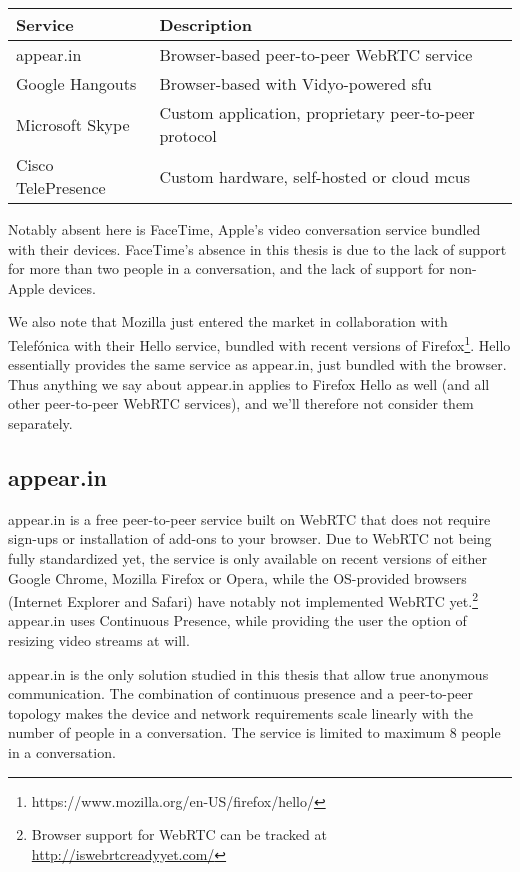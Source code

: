 \begin{center}
	\label{tab:existing-solutions}
	\begin{tabular}{| l | l |}
		\hline
		\textbf{Service} & \textbf{Description} \\ \hline
		appear.in & Browser-based peer-to-peer WebRTC service \\ \hline
		Google Hangouts & Browser-based with Vidyo-powered \gls{sfu} \\ \hline
		Microsoft Skype & Custom application, proprietary peer-to-peer protocol \\ \hline
		Cisco TelePresence & Custom hardware, self-hosted or cloud \glspl{mcu} \\ \hline
	\end{tabular}
\end{center}

Notably absent here is FaceTime, Apple's video conversation service bundled with their devices. FaceTime's absence in this thesis is due to the lack of support for more than two people in a conversation, and the lack of support for non-Apple devices.

We also note that Mozilla just entered the market in collaboration with Telefónica with their Hello service, bundled with recent versions of Firefox\footnote{https://www.mozilla.org/en-US/firefox/hello/}. Hello essentially provides the same service as appear.in, just bundled with the browser. Thus anything we say about appear.in applies to Firefox Hello as well (and all other peer-to-peer WebRTC services), and we'll therefore not consider them separately.

\subsection{appear.in}

appear.in is a free peer-to-peer service built on WebRTC that does not require sign-ups or installation of add-ons to your browser. Due to WebRTC not being fully standardized yet, the service is only available on recent versions of either Google Chrome, Mozilla Firefox or Opera, while the OS-provided browsers (Internet Explorer and Safari) have notably not implemented WebRTC yet.\footnote{Browser support for WebRTC can be tracked at \url{http://iswebrtcreadyyet.com/}} appear.in uses Continuous Presence, while providing the user the option of resizing video streams at will.

appear.in is the only solution studied in this thesis that allow true anonymous communication. The combination of continuous presence and a peer-to-peer topology makes the device and network requirements scale linearly with the number of people in a conversation. The service is limited to maximum 8 people in a conversation.


